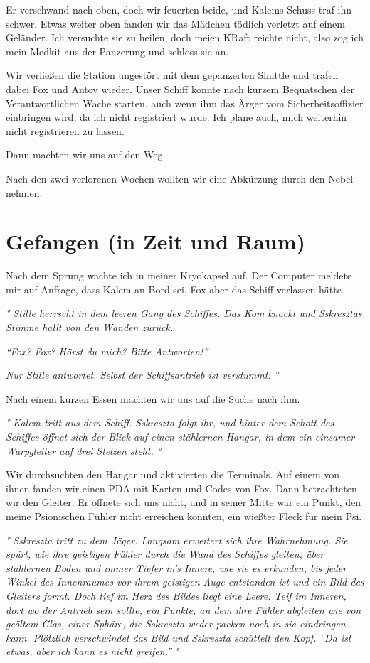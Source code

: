 \documentclass[11pt]{scrartcl}
\begin{document}
Er verschwand nach oben, doch wir feuerten beide, und Kalems Schuss traf
ihn schwer. Etwas weiter oben fanden wir das Mädchen tödlich verletzt
auf einem Geländer. Ich versuchte sie zu heilen, doch meien KRaft
reichte nicht, also zog ich mein Medkit aus der Panzerung und schloss
sie an.

Wir verließen die Station ungestört mit dem gepanzerten Shuttle und
trafen dabei Fox und Antov wieder. Unser Schiff konnte nach kurzem
Bequatschen der Verantwortlichen Wache starten, auch wenn ihm das Ärger
vom Sicherheitsoffizier einbringen wird, da ich nicht registriert wurde.
Ich plane auch, mich weiterhin nicht registrieren zu lassen.

Dann machten wir uns auf den Weg.

Nach den zwei verlorenen Wochen wollten wir eine Abkürzung durch den
Nebel nehmen.

\section{Gefangen (in Zeit und Raum)}

Nach dem Sprung wachte ich in meiner Kryokapsel auf. Der Computer
meldete mir auf Anfrage, dass Kalem an Bord sei, Fox aber das Schiff
verlassen hätte.

\emph{° Stille herrscht in dem leeren Gang des Schiffes. Das Kom knackt
und Sskresztas Stimme hallt von den Wänden zurück.}

\emph{``Fox? Fox? Hörst du mich? Bitte Antworten!''}

\emph{Nur Stille antwortet. Selbst der Schiffsantrieb ist verstummt. °}

Nach einem kurzen Essen machten wir uns auf die Suche nach ihm.

\emph{° Kalem tritt aus dem Schiff. Sskreszta folgt ihr, und hinter dem
Schott des Schiffes öffnet sich der Blick auf einen stählernen Hangar,
in dem ein einsamer Warpgleiter auf drei Stelzen steht. °}

Wir durchsuchten den Hangar und aktivierten die Terminals. Auf einem von
ihnen fanden wir einen PDA mit Karten und Codes von Fox. Dann
betrachteten wir den Gleiter. Er öffnete sich uns nicht, und in seiner
Mitte war ein Punkt, den meine Psionischen Fühler nicht erreichen
konnten, ein wießter Fleck für mein Psi.

\emph{° Sskreszta tritt zu dem Jäger. Langsam erweitert sich ihre
Wahrnehmung. Sie spürt, wie ihre geistigen Fühler durch die Wand des
Schiffes gleiten, über stählernen Boden und immer Tiefer in's Innere,
wie sie es erkunden, bis jeder Winkel des Innenraumes vor ihrem
geistigen Auge entstanden ist und ein Bild des Gleiters formt. Doch tief
im Herz des Bildes liegt eine Leere. Teif im Inneren, dort wo der
Antrieb sein sollte, ein Punkte, an dem ihre Fühler abgleiten wie von
geöltem Glas, einer Sphäre, die Sskreszta weder packen noch in sie
eindringen kann. Plötzlich verschwindet das Bild und Sskreszta schüttelt
den Kopf. ``Da ist etwas, aber ich kann es nicht greifen.'' °}
\end{document}
